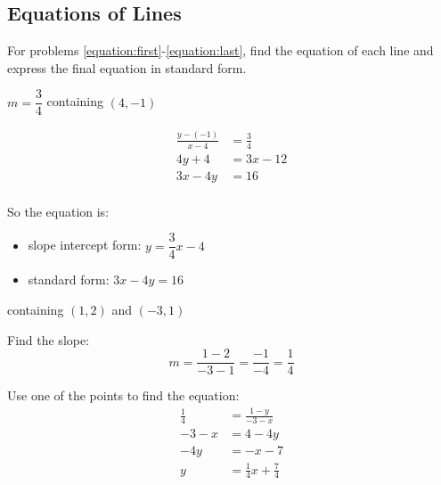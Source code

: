 \documentclass[fleqn,addpoints]{exam}
\begin{document}
\begin{questions}
\ifprintanswers
\pagebreak
\fi

\section{Equations of Lines}

For problems \ref{equation:first}-\ref{equation:last}, find the equation of each line and express the final equation in standard form.

\question[10] $m=\dfrac{3}{4}$ containing $(4, -1)$
\label{equation:first}
\begin{solution}[6 cm]
\begin{align*}
  \frac{y - (-1)}{x - 4} &= \frac{3}{4} \\
  4y + 4 &= 3x - 12 \\
  3x - 4y &= 16 \\
\end{align*}

So the equation is: 
\begin{itemize}
  \item slope intercept form: $y = \dfrac{3}{4}x - 4$
  \item standard form: $3x-4y = 16$
\end{itemize}




\end{solution}

\ifprintanswers
\pagebreak
\fi

\question[10] containing $(1, 2)$ and $(-3, 1)$
\begin{solution}[6 cm]

Find the slope:
\[
  m = \frac{1-2}{-3-1} = \frac{-1}{-4} = \frac{1}{4}
\]

Use one of the points to find the equation:
\begin{align*}
  \frac{1}{4} &= \frac{1-y}{-3-x} \\
  -3-x &= 4 - 4y \\
  -4y &= -x-7 \\
  y &= \frac{1}{4} x + \frac{7}{4} \\
\end{align*}


\end{solution}
\end{questions}
\end{document}
